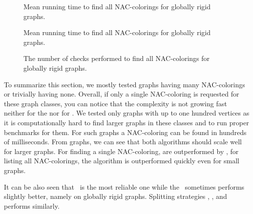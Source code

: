 \begin{figure}[p]
	\centering
	\scalebox{0.5}{}
	\caption[Mean runtime for globally rigid graphs (some).]{
		Mean running time to find all NAC-colorings for globally rigid graphs.}%
	\label{fig:graph_globally_rigid_first_runtime}
\end{figure}%
\begin{figure}[p]
	\centering
	\scalebox{0.5}{}
	\caption[Mean runtime for globally rigid graphs (all).]{
		Mean running time to find all NAC-colorings for globally rigid graphs.}%
	\label{fig:graph_globally_rigid_all_runtime}
\end{figure}%
\begin{figure}[p]
	\centering
	\scalebox{0.5}{}
	\caption[Checks performed for globally rigid graphs (all).]{
		The number of checks performed to find all NAC-colorings for globally rigid graphs.}%
	\label{fig:graph_globally_rigid_all_checks}
\end{figure}%

To summarize this section, we mostly tested graphs having many NAC-colorings
or trivially having none.
Overall, if only a single NAC-coloring is requested
for these graph classes, you can notice that the complexity
is not growing fast neither for the \NaiveCycles{} nor for \Subgraphs{}.
We tested only graphs with up to one hundred vertices
as it is computationally hard to find larger graphs in these classes
and to run proper benchmarks for them.
For such graphs a NAC-coloring can be found in hundreds of milliseconds.
From graphs, we can see that both algorithms should scale well for larger graphs.
For finding a single NAC-coloring, \Subgraphs{} are outperformed by \NaiveCycles{},
for listing all NAC-colorings, the \NaiveCycles{} algorithm
is outperformed quickly even for small graphs.

It can be also seen that \MergeLinear\ is the most reliable one
while the \SharedVertices\ sometimes performs slightly better,
namely on globally rigid graphs.
%
Splitting strategies \None{}, \CycleMask{}, \Neighbors{} and \NeighborsDegree{}
performs similarly.



